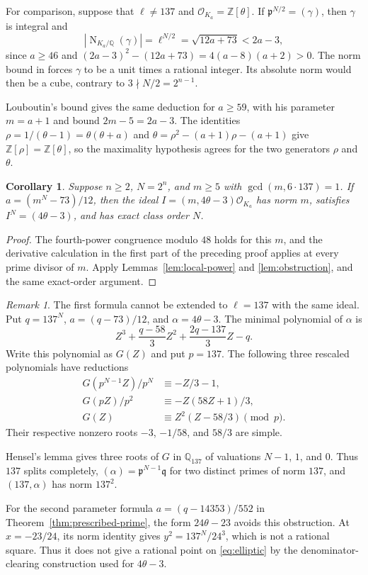 \documentclass[draft]{publmathdeb}
\newtheorem{corollary}[theorem]{Corollary}
\theoremstyle{remark}
\newtheorem{remark}[theorem]{Remark}
\numberwithin{equation}{section}
\newcommand{\Q}{\mathbb Q}
\newcommand{\Z}{\mathbb Z}
\DeclareMathOperator{\Nm}{N}
\begin{document}
For comparison, suppose that $\ell\ne137$ and $\mathcal O_{K_a}=\Z[\theta]$. If $\mathfrak p^{N/2}=(\gamma)$, then $\gamma$ is integral and
\[
  |\Nm_{K_a/\Q}(\gamma)|=\ell^{N/2}=\sqrt{12a+73}<2a-3,
\]
since $a\geq46$ and $(2a-3)^2-(12a+73)=4(a-8)(a+2)>0$. The norm bound in \cite{KalaSgallovaTinkova2025} forces $\gamma$ to be a unit times a rational integer. Its absolute norm would then be a cube, contrary to $3\nmid N/2=2^{n-1}$.

Louboutin's bound \cite[Theorem 10]{Louboutin2001} gives the same deduction for $a\geq59$, with his parameter $m=a+1$ and bound $2m-5=2a-3$. The identities $\rho=1/(\theta-1)=\theta(\theta+a)$ and $\theta=\rho^2-(a+1)\rho-(a+1)$ give $\Z[\rho]=\Z[\theta]$, so the maximality hypothesis agrees for the two generators $\rho$ and $\theta$.

\begin{corollary}\label{cor:composite}
  Suppose $n\geq2$, $N=2^n$, and $m\geq5$ with $\gcd(m,6\cdot137)=1$. If $a=(m^N-73)/12$, then the ideal $I=(m,4\theta-3)\mathcal O_{K_a}$ has norm $m$, satisfies $I^N=(4\theta-3)$, and has exact class order $N$.
\end{corollary}

\begin{proof}
  The fourth-power congruence modulo $48$ holds for this $m$, and the derivative calculation in the first part of the preceding proof applies at every prime divisor of $m$. Apply Lemmas~\ref{lem:local-power} and \ref{lem:obstruction}, and the same exact-order argument.
\end{proof}

\begin{remark}\label{rem:137}
  The first formula cannot be extended to $\ell=137$ with the same ideal. Put $q=137^N$, $a=(q-73)/12$, and $\alpha=4\theta-3$. The minimal polynomial of $\alpha$ is
  \[
    Z^3+\frac{q-58}{3}Z^2+\frac{2q-137}{3}Z-q.
  \]
  Write this polynomial as $G(Z)$ and put $p=137$. The following three rescaled polynomials have reductions
  \begin{align*}
    G(p^{N-1}Z)/p^N & \equiv -Z/3-1,              \\
    G(pZ)/p^2       & \equiv -Z(58Z+1)/3,         \\
    G(Z)            & \equiv Z^2(Z-58/3) \pmod p.
  \end{align*}
  Their respective nonzero roots $-3$, $-1/58$, and $58/3$ are simple.

  Hensel's lemma gives three roots of $G$ in $\Q_{137}$ of valuations $N-1$, $1$, and $0$. Thus $137$ splits completely, $(\alpha)=\mathfrak p^{N-1}\mathfrak q$ for two distinct primes of norm $137$, and $(137,\alpha)$ has norm $137^2$.

  For the second parameter formula $a=(q-14353)/552$ in Theorem~\ref{thm:prescribed-prime}, the form $24\theta-23$ avoids this obstruction. At $x=-23/24$, its norm identity gives $y^2=137^N/24^3$, which is not a rational square. Thus it does not give a rational point on \eqref{eq:elliptic} by the denominator-clearing construction used for $4\theta-3$.
\end{remark}
\end{document}
